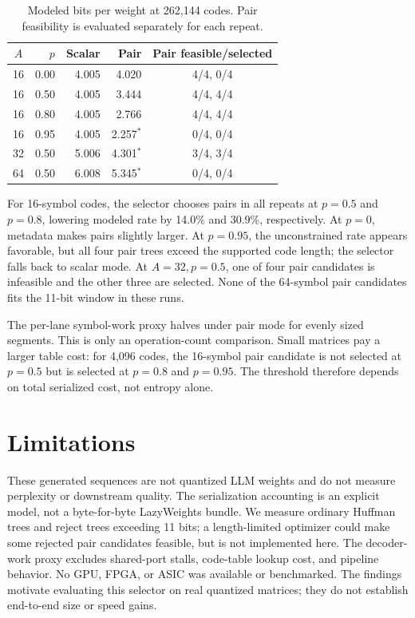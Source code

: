 \documentclass[11pt]{article}
\begin{document}
\begin{table}[t]
\centering\small
\begin{tabular}{crrrc}
\toprule
$A$ & $p$ & Scalar & Pair & Pair feasible/selected \\
\midrule
16 & 0.00 & 4.005 & 4.020 & 4/4, 0/4 \\
16 & 0.50 & 4.005 & 3.444 & 4/4, 4/4 \\
16 & 0.80 & 4.005 & 2.766 & 4/4, 4/4 \\
16 & 0.95 & 4.005 & 2.257$^*$ & 0/4, 0/4 \\
32 & 0.50 & 5.006 & 4.301$^*$ & 3/4, 3/4 \\
64 & 0.50 & 6.008 & 5.345$^*$ & 0/4, 0/4 \\
\bottomrule
\end{tabular}
\caption{Modeled bits per weight at 262,144 codes. Pair feasibility is evaluated separately for each repeat.}
\label{tab:rates}
\end{table}

For 16-symbol codes, the selector chooses pairs in all repeats at $p=0.5$ and $p=0.8$, lowering modeled rate by 14.0\% and 30.9\%, respectively. At $p=0$, metadata makes pairs slightly larger. At $p=0.95$, the unconstrained rate appears favorable, but all four pair trees exceed the supported code length; the selector falls back to scalar mode. At $A=32,p=0.5$, one of four pair candidates is infeasible and the other three are selected. None of the 64-symbol pair candidates fits the 11-bit window in these runs.

The per-lane symbol-work proxy halves under pair mode for evenly sized segments. This is only an operation-count comparison. Small matrices pay a larger table cost: for 4,096 codes, the 16-symbol pair candidate is not selected at $p=0.5$ but is selected at $p=0.8$ and $p=0.95$. The threshold therefore depends on total serialized cost, not entropy alone.

\section{Limitations}
These generated sequences are not quantized LLM weights and do not measure perplexity or downstream quality. The serialization accounting is an explicit model, not a byte-for-byte LazyWeights bundle. We measure ordinary Huffman trees and reject trees exceeding 11 bits; a length-limited optimizer could make some rejected pair candidates feasible, but is not implemented here. The decoder-work proxy excludes shared-port stalls, code-table lookup cost, and pipeline behavior. No GPU, FPGA, or ASIC was available or benchmarked. The findings motivate evaluating this selector on real quantized matrices; they do not establish end-to-end size or speed gains.
\end{document}
